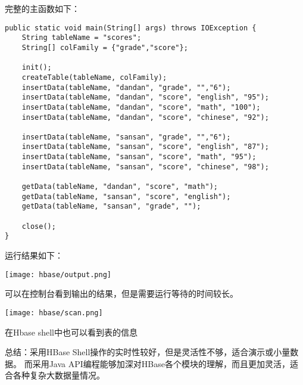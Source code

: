 完整的主函数如下：

\begin{lstlisting}[style=customjava,title=完整的主函数]
public static void main(String[] args) throws IOException {
	String tableName = "scores";
	String[] colFamily = {"grade","score"};

	init();
	createTable(tableName, colFamily);
	insertData(tableName, "dandan", "grade", "","6");
	insertData(tableName, "dandan", "score", "english", "95");
	insertData(tableName, "dandan", "score", "math", "100");
	insertData(tableName, "dandan", "score", "chinese", "92");

	insertData(tableName, "sansan", "grade", "","6");
	insertData(tableName, "sansan", "score", "english", "87");
	insertData(tableName, "sansan", "score", "math", "95");
	insertData(tableName, "sansan", "score", "chinese", "98");

	getData(tableName, "dandan", "score", "math");
	getData(tableName, "sansan", "score", "english");
	getData(tableName, "sansan", "grade", "");

	close();
}
\end{lstlisting}

运行结果如下：

\begin{center}
	\texttt{[image: hbase/output.png]}

	可以在控制台看到输出的结果，但是需要运行等待的时间较长。

	\texttt{[image: hbase/scan.png]}

	在Hbase shell中也可以看到表的信息
\end{center}

总结：采用HBase Shell操作的实时性较好，但是灵活性不够，适合演示或小量数据。
而采用Java API编程能够加深对HBase各个模块的理解，而且更加灵活，适合各种复杂大数据量情况。

